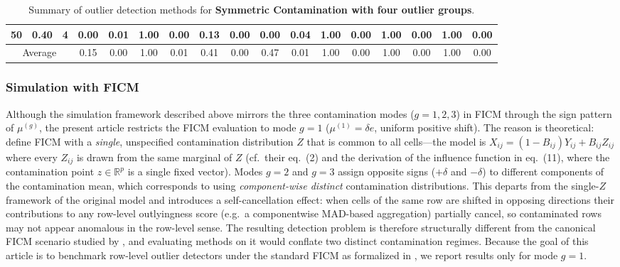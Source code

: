 \documentclass[12pt]{article}
\begin{document}
\begin{table}[H]
{\begin{tabular}{|*{17}{c|}|}
50 & 0.40 & 4 & 0.00 & 0.01 & 1.00 & 0.00 & 0.13 & 0.00 & 0.00 & 0.04 & 1.00 & 0.00 & 1.00 & 0.00 & 1.00 & 0.00 \\ \hline
\multicolumn{3}{|c|}{Average} & 0.15 & 0.00 & 1.00 & 0.01 & 0.41 & 0.00 & 0.47 & 0.01 & 1.00 & 0.00 & 1.00 & 0.00 & 1.00 & 0.00 \\ \hline
\end{tabular}}
\endgroup
\caption{Summary of outlier detection methods for \textbf{Symmetric Contamination with four outlier groups}.}
\label{tab:fdcm_four_groups}
\end{table}

\subsubsection*{Simulation with FICM }

Although the simulation framework described above mirrors the three contamination modes (\(g=1,2,3\)) in FICM through the sign pattern of \(\mu^{(g)}\), the present article restricts the FICM evaluation to mode \(g=1\) (\(\mu^{(1)}=\delta e\), uniform positive shift). The reason is theoretical: \citet{Alqallaf2009} define FICM with a \emph{single}, unspecified contamination distribution \(Z\) that is common to all cells—the model is \(X_{ij}=(1-B_{ij})Y_{ij}+B_{ij}Z_{ij}\) where every \(Z_{ij}\) is drawn from the same marginal of \(Z\) (cf.\ their eq.\ (2) and the derivation of the influence function in eq.\ (11), where the contamination point \(z\in\mathbb{R}^p\) is a single fixed vector). Modes \(g=2\) and \(g=3\) assign opposite signs (\(+\delta\) and \(-\delta\)) to different components of the contamination mean, which corresponds to using \emph{component-wise distinct} contamination distributions. This departs from the single-\(Z\) framework of the original model and introduces a self-cancellation effect: when cells of the same row are shifted in opposing directions their contributions to any row-level outlyingness score (e.g.\ a componentwise MAD-based aggregation) partially cancel, so contaminated rows may not appear anomalous in the row-level sense. The resulting detection problem is therefore structurally different from the canonical FICM scenario studied by \citet{Alqallaf2009}, and evaluating methods on it would conflate two distinct contamination regimes. Because the goal of this article is to benchmark row-level outlier detectors under the standard FICM as formalized in \citet{Alqallaf2009}, we report results only for mode \(g=1\).\\
\end{document}
